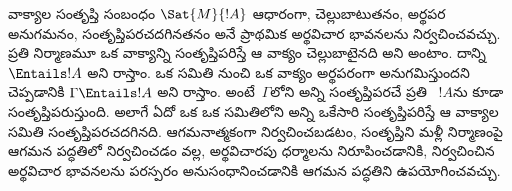 \documentclass[../../../include/open-logic-section]{subfiles}
\begin{document}
వాక్యాల సంతృప్తి సంబంధం $\Sat{M}{!A}$ ఆధారంగా, చెల్లుబాటుతనం, అర్థపర అనుగమనం, సంతృప్తిపరచదగినతనం అనే ప్రాథమిక అర్థవిచార భావనలను నిర్వచించవచ్చు. ప్రతి నిర్మాణమూ ఒక వాక్యాన్ని సంతృప్తిపరిస్తే ఆ వాక్యం చెల్లుబాటైనది అని అంటాం. దాన్ని $\Entails !A$ అని రాస్తాం. ఒక  సమితి నుంచి ఒక వాక్యం అర్థపరంగా అనుగమిస్తుందని చెప్పడానికి $\Gamma \Entails !A$ అని రాస్తాం. అంటే~$\Gamma$లోని అన్ని  సంతృప్తిపరచే ప్రతి ~$!A$ను కూడా సంతృప్తిపరుస్తుంది. అలాగే ఏదో ఒక  ఒక సమితిలోని అన్ని  ఒకేసారి సంతృప్తిపరిస్తే ఆ వాక్యాల సమితి సంతృప్తిపరచదగినది.  ఆగమనాత్మకంగా నిర్వచించబడటం, సంతృప్తిని మళ్లీ  నిర్మాణంపై ఆగమన పద్ధతిలో నిర్వచించడం వల్ల, అర్థవిచారపు ధర్మాలను నిరూపించడానికి, నిర్వచించిన అర్థవిచార భావనలను పరస్పరం అనుసంధానించడానికి ఆగమన పద్ధతిని ఉపయోగించవచ్చు.
\end{document}
